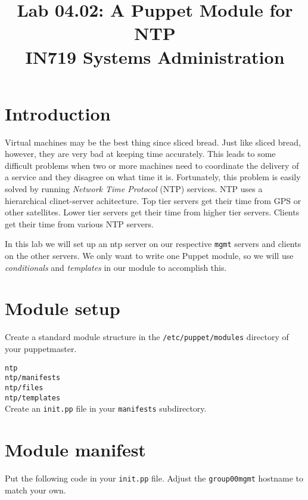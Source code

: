 \documentclass{article}   	%
\title{Lab 04.02: A Puppet Module for NTP \\ IN719 Systems Administration}
\date{}							%
\begin{document}
\maketitle

\section*{Introduction}
Virtual machines may be the best thing since sliced bread. Just like sliced bread, however, they are very bad at keeping time accurately. This leads to some difficult problems when two or more machines need to coordinate the delivery of a service and they disagree on what time it is. Fortunately, this problem is easily solved by running \emph{Network Time Protocol} (NTP) services. NTP uses a hierarchical clinet-server achitecture. Top tier servers get their time from GPS or other satellites. Lower tier servers get their time from higher tier servers. Clients get their time from various NTP servers.

In this lab we will set up an ntp server on our respective \texttt{mgmt} servers and clients on the other servers. We only want to write one Puppet module, so we will use \emph{conditionals} and \emph{templates} in our module to accomplish this.

\section{Module setup}
Create a standard module structure in the \texttt{/etc/puppet/modules} directory of your puppetmaster.

\texttt{ntp} \\
\texttt{ntp/manifests} \\
\texttt{ntp/files} \\
\texttt{ntp/templates} \\

Create an \texttt{init.pp} file in your \texttt{manifests} subdirectory.

\section{Module manifest}
Put the following code in your \texttt{init.pp} file.  Adjust the \texttt{group00mgmt} hostname to match your own.
\end{document}
